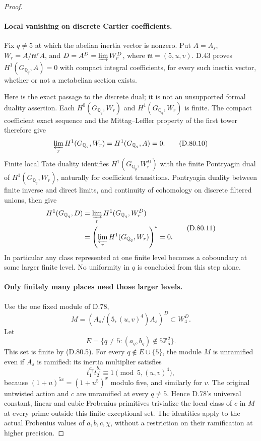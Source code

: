 \begin{proof}
\paragraph{Local vanishing on discrete Cartier coefficients.}
Fix \(q\ne5\) at which the abelian inertia vector is
nonzero. Put \(A=A_s\), \(W_r=A/\mathfrak m^r A\),
and \(D=A^D=\varinjlim W_r^D\), where
\(\mathfrak m=(5,u,v)\). D.43 proves
\(H^1(G_{\mathbb Q_q},A)=0\) with compact integral
coefficients, for every such inertia vector, whether
or not a metabelian section exists.

Here is the exact passage to the discrete dual; it is
not an unsupported formal duality assertion. Each
\(H^0(G_{\mathbb Q_q},W_r)\) and
\(H^1(G_{\mathbb Q_q},W_r)\) is finite. The compact
coefficient exact sequence and the Mittag--Leffler
property of the first tower therefore give
\[
 \varprojlim_r H^1(G_{\mathbb Q_q},W_r)
                    =H^1(G_{\mathbb Q_q},A)=0.          \tag{D.80.10}
\]
Finite local Tate duality
\cite[I, Corollary 2.3]{DE_MilneADT} identifies
\(H^1(G_{\mathbb Q_q},W_r^D)\) with the finite
Pontryagin dual of \(H^1(G_{\mathbb Q_q},W_r)\),
naturally for coefficient transitions. Pontryagin
duality between finite inverse and direct limits, and
continuity of cohomology on discrete filtered unions,
then give
\[
 \begin{split}
 H^1(G_{\mathbb Q_q},D)
  &=\varinjlim_r H^1(G_{\mathbb Q_q},W_r^D)\\
  &=\left(\varprojlim_r H^1(G_{\mathbb Q_q},W_r)\right)^*
   =0.
 \end{split}                                             \tag{D.80.11}
\]
In particular any class represented at one finite level
becomes a coboundary at some larger finite level.
No uniformity in \(q\) is concluded from this step alone.

\paragraph{Only finitely many places need those larger levels.}
Use the one fixed module of D.78,
\[
          M=(A_s/(5,(u,v)^4)A_s)^D\subset W_4^D.
                                                               \tag{D.80.12}
\]
Let
\[
 E=\{q\ne5:(a_q,b_q)\notin5\mathbb Z_5^2\}.
                                                               \tag{D.80.13}
\]
This set is finite by (D.80.5). For every \(q\notin E\cup\{5\}\),
the module \(M\) is unramified even if \(A_s\) is ramified:
its inertia multiplier satisfies
\[
 t_1^{a_q}t_2^{b_q}\equiv1\pmod{5,(u,v)^4},             \tag{D.80.14}
\]
because \((1+u)^{5x}=(1+u^5)^x\) modulo five, and similarly
for \(v\). The original untwisted action and \(c\) are
unramified at every \(q\ne5\). Hence D.78's universal
constant, linear and cubic Frobenius primitives trivialize
the local class of \(c\) in \(M\) at every prime outside
this finite exceptional set. The identities apply to the
actual Frobenius values of \(a,b,c,\chi\), without a
restriction on their ramification at higher precision.


\end{proof}
